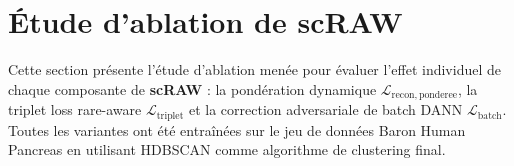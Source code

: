

\newpage
\section{Étude d'ablation de scRAW}
\label{annexe:ablation_scraw}

Cette section présente l'étude d'ablation menée pour évaluer l'effet individuel de chaque composante de \textbf{scRAW} : la pondération dynamique \(\mathcal{L}_{\mathrm{recon,ponderee}}\), la triplet loss rare-aware \(\mathcal{L}_{\mathrm{triplet}}\) et la correction adversariale de batch DANN \(\mathcal{L}_{\mathrm{batch}}\). Toutes les variantes ont été entraînées sur le jeu de données Baron Human Pancreas en utilisant HDBSCAN comme algorithme de clustering final.

